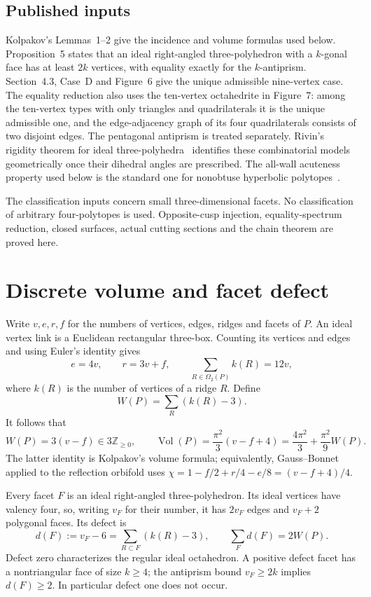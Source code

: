 \documentclass[11pt]{article}
\theoremstyle{remark}
\newcommand{\Vol}{\operatorname{Vol}}
\begin{document}
\subsection{Published inputs}
Kolpakov's Lemmas~1--2 give the incidence and volume formulas used
below. Proposition~5 states that an ideal right-angled
three-polyhedron with a $k$-gonal face has at least $2k$ vertices,
with equality exactly for the $k$-antiprism. Section~4.3, Case~D and
Figure~6 give the unique admissible nine-vertex case. The equality
reduction also uses the ten-vertex octahedrite in Figure~7: among the
ten-vertex types with only triangles and quadrilaterals it is the
unique admissible one, and the edge-adjacency graph of its four
quadrilaterals consists of two disjoint edges. The pentagonal
antiprism is treated separately. Rivin's rigidity theorem for ideal
three-polyhedra~\cite{Rivin} identifies these combinatorial models
geometrically once their dihedral angles are prescribed. The
all-wall acuteness property used below is the standard one for
nonobtuse hyperbolic polytopes~\cite[\S2.1]{Vinberg}.

The classification inputs concern small three-dimensional facets. No classification
of arbitrary four-polytopes is used. Opposite-cusp injection,
equality-spectrum reduction, closed surfaces, actual cutting
sections and the chain theorem are proved here.

\section{Discrete volume and facet defect}\label{sec:defect}
Write $v,e,r,f$ for the numbers of vertices, edges, ridges and facets of
$P$. An ideal vertex link is a Euclidean rectangular three-box. Counting
its vertices and edges and using Euler's identity gives
\[
 e=4v,\qquad r=3v+f,\qquad
 \sum_{R\in\Omega_2(P)} k(R)=12v,
\]
where $k(R)$ is the number of vertices of a ridge $R$. Define
\[
 W(P)=\sum_R(k(R)-3).
\]
It follows that
\begin{equation}\label{eq:discrete}
 W(P)=3(v-f)\in3\mathbb Z_{\ge0},\qquad
 \Vol(P)=\frac{\pi^2}{3}(v-f+4)
 =\frac{4\pi^2}{3}+\frac{\pi^2}{9}W(P).
\end{equation}
The latter identity is Kolpakov's volume formula; equivalently,
Gauss--Bonnet applied to the reflection orbifold uses
$\chi=1-f/2+r/4-e/8=(v-f+4)/4$.

Every facet $F$ is an ideal right-angled three-polyhedron. Its ideal
vertices have valency four, so, writing $v_F$ for their number, it has
$2v_F$ edges and $v_F+2$ polygonal faces. Its defect is
\begin{equation}\label{eq:facet}
 d(F):=v_F-6=\sum_{R\subset F}(k(R)-3),\qquad
 \sum_F d(F)=2W(P).
\end{equation}
Defect zero characterizes the regular ideal octahedron. A positive
defect facet has a nontriangular face of size $k\ge4$; the antiprism
bound $v_F\ge2k$ implies $d(F)\ge2$. In particular defect one does not
occur.
\end{document}
